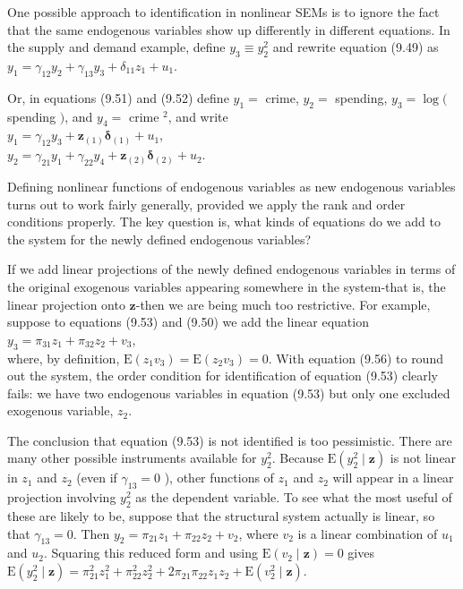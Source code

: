 \documentclass[10pt]{article}
\begin{document}
One possible approach to identification in nonlinear SEMs is to ignore the fact that the same endogenous variables show up differently in different equations. In the supply and demand example, define $y_{3} \equiv y_{2}^{2}$ and rewrite equation (9.49) as\\
$y_{1}=\gamma_{12} y_{2}+\gamma_{13} y_{3}+\delta_{11} z_{1}+u_{1}$.

Or, in equations (9.51) and (9.52) define $y_{1}=$ crime, $y_{2}=$ spending, $y_{3}= \log ($ spending $)$, and $y_{4}=$ crime $^{2}$, and write\\
$y_{1}=\gamma_{12} y_{3}+\mathbf{z}_{(1)} \boldsymbol{\delta}_{(1)}+u_{1}$,\\
$y_{2}=\gamma_{21} y_{1}+\gamma_{22} y_{4}+\mathbf{z}_{(2)} \boldsymbol{\delta}_{(2)}+u_{2}$.

Defining nonlinear functions of endogenous variables as new endogenous variables turns out to work fairly generally, provided we apply the rank and order conditions properly. The key question is, what kinds of equations do we add to the system for the newly defined endogenous variables?

If we add linear projections of the newly defined endogenous variables in terms of the original exogenous variables appearing somewhere in the system-that is, the\\
linear projection onto $\mathbf{z}$-then we are being much too restrictive. For example, suppose to equations (9.53) and (9.50) we add the linear equation\\
$y_{3}=\pi_{31} z_{1}+\pi_{32} z_{2}+v_{3}$,\\
where, by definition, $\mathrm{E}\left(z_{1} v_{3}\right)=\mathrm{E}\left(z_{2} v_{3}\right)=0$. With equation (9.56) to round out the system, the order condition for identification of equation (9.53) clearly fails: we have two endogenous variables in equation (9.53) but only one excluded exogenous variable, $z_{2}$.

The conclusion that equation (9.53) is not identified is too pessimistic. There are many other possible instruments available for $y_{2}^{2}$. Because $\mathrm{E}\left(y_{2}^{2} \mid \mathbf{z}\right)$ is not linear in $z_{1}$ and $z_{2}$ (even if $\gamma_{13}=0$ ), other functions of $z_{1}$ and $z_{2}$ will appear in a linear projection involving $y_{2}^{2}$ as the dependent variable. To see what the most useful of these are likely to be, suppose that the structural system actually is linear, so that $\gamma_{13}=0$. Then $y_{2}=\pi_{21} z_{1}+\pi_{22} z_{2}+v_{2}$, where $v_{2}$ is a linear combination of $u_{1}$ and $u_{2}$. Squaring this reduced form and using $\mathrm{E}\left(v_{2} \mid \mathbf{z}\right)=0$ gives\\
$\mathrm{E}\left(y_{2}^{2} \mid \mathbf{z}\right)=\pi_{21}^{2} z_{1}^{2}+\pi_{22}^{2} z_{2}^{2}+2 \pi_{21} \pi_{22} z_{1} z_{2}+\mathrm{E}\left(v_{2}^{2} \mid \mathbf{z}\right)$.
\end{document}
